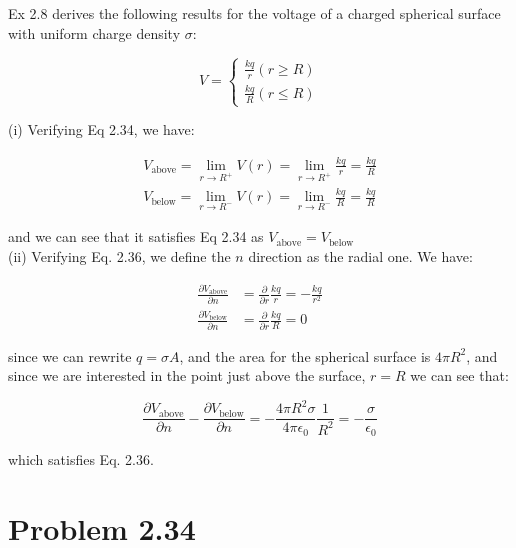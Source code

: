 \documentclass{article}
\numberwithin{equation}{section}
\numberwithin{figure}{section}
\begin{document}
Ex 2.8 derives the following results for the voltage of a charged spherical surface with uniform charge density $\sigma$:

\begin{equation}
    V = \begin{cases}
        \frac{kq}{r} (r \geq R) \\
        \frac{kq}{R} (r \leq R)
    \end{cases}
\end{equation}

(i) Verifying Eq 2.34, we have:

\begin{equation}
\begin{split}
    V_\text{above} = \lim_{r \to R^+} V(r) =  \lim_{r \to R^+} \frac{kq}{r} = \frac{kq}{R}\\
    V_\text{below} = \lim_{r \to R^-} V(r) =  \lim_{r \to R^-} \frac{kq}{R} = \frac{kq}{R}
\end{split}
\end{equation}

and we can see that it satisfies Eq 2.34 as $V_\text{above}=V_\text{below}$ \\

(ii) Verifying Eq. 2.36, we define the $n$ direction as the radial one. We have:

\begin{equation}
    \begin{split}
        \frac{\partial V_{\text{above}}}{\partial n} &= \frac{\partial}{\partial r} \frac{kq}{r} = - \frac{kq}{r^2} \\
        \frac{\partial V_{\text{below}}}{\partial n} &= \frac{\partial}{\partial r} \frac{kq}{R} = 0
    \end{split}
\end{equation}

since we can rewrite $q = \sigma A$, and the area for the spherical surface is $4 \pi R^2$, and since we are interested in the point just above the surface, $r = R$ we can see that:

\begin{equation}
    \frac{\partial V_{\text{above}}}{\partial n}- \frac{\partial V_{\text{below}}}{\partial n} =  - \frac{4 \pi R^2 \sigma}{4 \pi \epsilon_0} \frac{1}{R^2} = - \frac{\sigma}{\epsilon_0}
\end{equation}

which satisfies Eq. 2.36.

\section{Problem 2.34}
\end{document}
